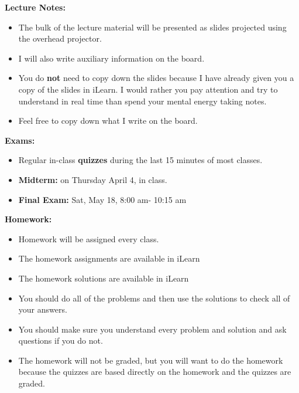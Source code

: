 \documentclass[oneside,12pt]{amsart}
\begin{document}
\bigskip

\textbf{Lecture Notes:}
\begin{itemize}
\item The bulk of the lecture material will be presented as slides projected using the overhead projector.
\item I will also write auxiliary information on the board.
\item You do \textbf{not} need to copy down the slides because I have already given you a copy of the slides in iLearn. I would rather you pay attention
and try to understand in real time than spend your mental energy taking notes.
\item Feel free to copy down what I write on the board.
\end{itemize}

\bigskip

\textbf{Exams:}
\begin{itemize}
\item Regular in-class \textbf{quizzes} during the last 15 minutes of most classes.
\item \textbf{Midterm:} on Thursday April 4, in class.
\item \textbf{Final Exam:} Sat, May 18, 8:00 am- 10:15 am
\end{itemize}

\bigskip

\textbf{Homework:}
\begin{itemize}
\item Homework will be assigned every class.
\item The homework assignments are available in iLearn
\item The homework solutions are available in iLearn
\item You should do all of the problems and then use the solutions to check all of your answers.
\item You should make sure you understand every problem and solution and ask questions if you do not.
\item The homework will not be graded, but you will want to do the homework because the quizzes are based directly on the homework and the quizzes are graded.
\end{itemize}

\bigskip
\end{document}
